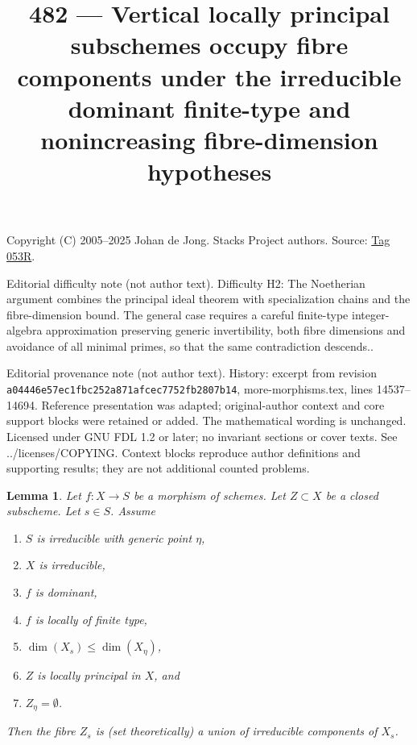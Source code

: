 \documentclass{amsart}
\theoremstyle{plain}
\newtheorem{lemma}[subsection]{Lemma}
\theoremstyle{definition}
\theoremstyle{remark}
\numberwithin{equation}{subsection}
\begin{document}
\title[Stacks Project, Tag 053R]{482 --- Vertical locally principal subschemes occupy fibre components under the irreducible dominant finite-type and nonincreasing fibre-dimension hypotheses}
\maketitle
\noindent Copyright (C) 2005--2025 Johan de Jong. Stacks Project authors. Source: \href{https://stacks.math.columbia.edu/tag/053R}{Tag 053R}.

\noindent Editorial difficulty note (not author text). Difficulty H2: The Noetherian argument combines the principal ideal theorem with specialization chains and the fibre-dimension bound. The general case requires a careful finite-type integer-algebra approximation preserving generic invertibility, both fibre dimensions and avoidance of all minimal primes, so that the same contradiction descends..

\noindent Editorial provenance note (not author text). History: excerpt from revision \texttt{a0444\allowbreak 6e57e\allowbreak c1fbc\allowbreak 252a8\allowbreak 71afc\allowbreak ec775\allowbreak 2fb28\allowbreak 07b14}, more-morphisms.tex, lines 14537--14694. Reference presentation was adapted; original-author context and core support blocks were retained or added. The mathematical wording is unchanged. Licensed under GNU FDL 1.2 or later; no invariant sections or cover texts. See ../licenses/COPYING. Context blocks reproduce author definitions and supporting results; they are not additional counted problems.

\begin{lemma}
\label{lemma-locally-principal-vertical}
Let $f : X \to S$ be a morphism of schemes.
Let $Z \subset X$ be a closed subscheme.
Let $s \in S$.
Assume
\begin{enumerate}
\item $S$ is irreducible with generic point $\eta$,
\item $X$ is irreducible,
\item $f$ is dominant,
\item $f$ is locally of finite type,
\item $\dim(X_s) \leq \dim(X_\eta)$,
\item $Z$ is locally principal in $X$, and
\item $Z_\eta = \emptyset$.
\end{enumerate}
Then the fibre $Z_s$ is (set theoretically) a union of
irreducible components of $X_s$.
\end{lemma}
\end{document}
